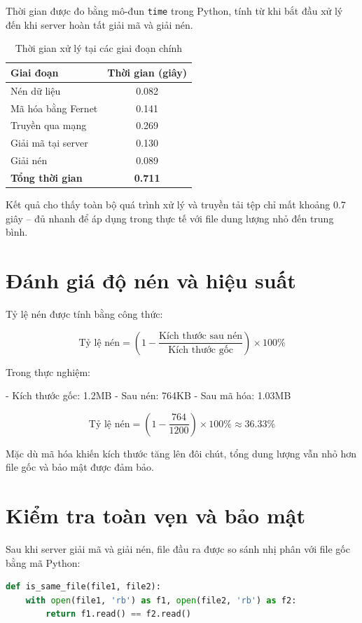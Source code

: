 Thời gian được đo bằng mô-đun \texttt{time} trong Python, tính từ khi bắt đầu xử lý đến khi server hoàn tất giải mã và giải nén.

\begin{table}[H]
  \centering
  \caption{Thời gian xử lý tại các giai đoạn chính}
  \begin{tabular}{|l|c|}
    \hline
    \textbf{Giai đoạn} & \textbf{Thời gian (giây)} \\
    \hline
    Nén dữ liệu & 0.082 \\
    Mã hóa bằng Fernet & 0.141 \\
    Truyền qua mạng & 0.269 \\
    Giải mã tại server & 0.130 \\
    Giải nén & 0.089 \\
    \hline
    \textbf{Tổng thời gian} & \textbf{0.711} \\
    \hline
  \end{tabular}
\end{table}

Kết quả cho thấy toàn bộ quá trình xử lý và truyền tải tệp chỉ mất khoảng 0.7 giây – đủ nhanh để áp dụng trong thực tế với file dung lượng nhỏ đến trung bình.

\section{Đánh giá độ nén và hiệu suất}

Tỷ lệ nén được tính bằng công thức:

\[
\text{Tỷ lệ nén} = \left( 1 - \frac{\text{Kích thước sau nén}}{\text{Kích thước gốc}} \right) \times 100\%
\]

Trong thực nghiệm:

- Kích thước gốc: 1.2MB
- Sau nén: 764KB
- Sau mã hóa: 1.03MB

\[
\text{Tỷ lệ nén} = (1 - \frac{764}{1200}) \times 100\% \approx 36.33\%
\]

Mặc dù mã hóa khiến kích thước tăng lên đôi chút, tổng dung lượng vẫn nhỏ hơn file gốc và bảo mật được đảm bảo.

\section{Kiểm tra toàn vẹn và bảo mật}

Sau khi server giải mã và giải nén, file đầu ra được so sánh nhị phân với file gốc bằng mã Python:

\begin{lstlisting}[language=Python, caption={Kiểm tra toàn vẹn dữ liệu}, label={code:integrity}]
def is_same_file(file1, file2):
    with open(file1, 'rb') as f1, open(file2, 'rb') as f2:
        return f1.read() == f2.read()
\end{lstlisting}

